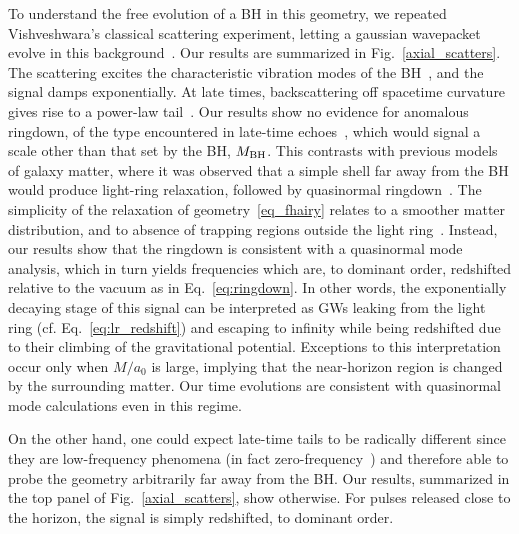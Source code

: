 \documentclass[twocolumn,preprintnumbers,nofootinbib,prd,superscriptaddress,aps]{revtex4-1}
\begin{document}
To understand the free evolution of a BH in this geometry, we repeated Vishveshwara's classical scattering experiment, 
letting a gaussian wavepacket evolve in this background~\cite{Vishveshwara:1970zz}. Our results are summarized in Fig.~\ref{axial_scatters}. 
The scattering excites the characteristic vibration modes of the BH~\cite{Berti:2009kk,Cardoso:2016rao,Cardoso:2016oxy,Cardoso:2019rvt}, and the signal damps exponentially. At late times, backscattering off spacetime curvature gives rise to a power-law tail~\cite{Price:1971fb,Ching:1994bd,Blanchet:1994ez}.
Our results show no evidence for anomalous ringdown, of the type encountered in late-time echoes~\cite{Cardoso:2016rao,Cardoso:2016oxy,Cardoso:2017cqb,Cardoso:2019rvt}, which would 
signal a scale other than that set by the BH, $M_{\rm BH}$. This contrasts with previous models of galaxy matter, where it was observed that a simple shell far away from the BH would produce light-ring relaxation, followed by quasinormal ringdown~\cite{Barausse:2014tra,Cardoso:2019rvt}. The simplicity of the relaxation of geometry~\eqref{eq_fhairy} relates to a smoother matter distribution, and to absence of trapping regions outside the light ring~\cite{Zworski99,SjoZwo99}.
Instead, our results show that the ringdown is consistent with a quasinormal mode analysis, which in turn yields frequencies which are, to dominant order, redshifted relative to the vacuum as in Eq.~\eqref{eq:ringdown}. In other words, the exponentially decaying stage of this signal can be interpreted as GWs leaking from the light ring (cf. Eq.~\eqref{eq:lr_redshift}) and escaping to infinity while being redshifted due to their climbing of the gravitational potential. Exceptions to this interpretation occur only when $M/a_0$ is large, implying that the near-horizon region is changed by the surrounding matter. Our time evolutions are consistent with quasinormal mode calculations even in this regime.


On the other hand, one could expect late-time tails to be radically different since they are low-frequency phenomena (in fact zero-frequency~\cite{Price:1971fb,Ching:1994bd,Blanchet:1994ez}) and therefore able to probe the geometry arbitrarily far away from the BH. Our results, summarized in the top panel of Fig.~\ref{axial_scatters}, show otherwise. For pulses released close to the horizon, 
the signal is simply redshifted, to dominant order.
\end{document}

